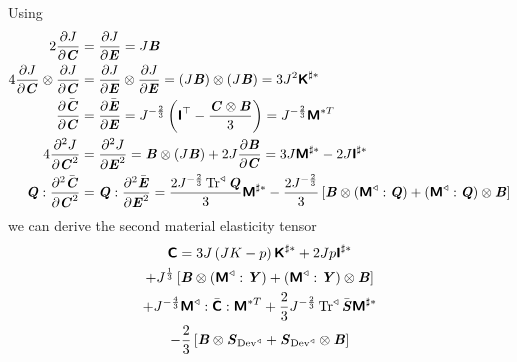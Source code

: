 Using
\begin{align}
  2\delby{J}{\tensor{C}}&=\delby{J}{\tensor{E}}=J\tensor{B} \\
  4\tensorprod{\delby{J}{\tensor{C}}}{\delby{J}{\tensor{C}}}&=\tensorprod{\delby{J}{\tensor{E}}}{\delby{J}{\tensor{E}}}=\tensorprod{\pbrac{J\tensor{B}}}{\pbrac{J\tensor{B}}}=3J^{2}\tensorfour{K}^{\sharp
    *} \\
  \delby{\bar{\tensor{C}}}{\tensor{C}}&=\delby{\bar{\tensor{E}}}{\tensor{E}}=J^{-\frac{2}{3}}\pbrac{\transpose{\tensorfour{I}}-\dfrac{\tensorprod{\tensor{C}}{\tensor{B}}}{3}}=J^{-\frac{2}{3}}\tensorfour{M}^{*T} \\
  4\deltwosqby{J}{\tensor{C}}&=\deltwosqby{J}{\tensor{E}}=\tensorprod{\tensor{B}}{\pbrac{J\tensor{B}}}+2J\delby{\tensor{B}}{\tensor{C}}=3J\tensorfour{M}^{\sharp
    *}-2J\tensorfour{I}^{\sharp
    *} \\
  \doubledotprod{\tensor{Q}}{\deltwosqby{\bar{\tensor{C}}}{\tensor{C}}}&=\doubledotprod{\tensor{Q}}{\deltwosqby{\bar{\tensor{E}}}{\tensor{E}}}=\dfrac{2J^{-\frac{2}{3}}\pullback{\Trop}{\tensor{Q}}}{3}\tensorfour{M}^{\sharp
  *}-\dfrac{2J^{-\frac{2}{3}}}{3}\sqbrac{\tensorprod{\tensor{B}}{\pbrac{\doubledotprod{\pullback{\tensorfour{M}}{}}{\tensor{Q}}}}+\tensorprod{\pbrac{\doubledotprod{\pullback{\tensorfour{M}}{}}{\tensor{Q}}}}{\tensor{B}}}
\end{align}
we can derive the second material elasticity tensor
\begin{multline}
  \tensorfour{C}=3J\pbrac{JK-p}\tensorfour{K}^{\sharp
    *}+2Jp\tensorfour{I}^{\sharp
    *}\\
  +J^{\frac{1}{3}}\sqbrac{\tensorprod{\tensortwo{B}}{\pbrac{\doubledotprod{\pullback{\tensorfour{M}}}{\tensortwo{Y}}{}}}+\tensorprod{\pbrac{\doubledotprod{\pullback{\tensorfour{M}}{}}{\tensortwo{Y}}}}{\tensortwo{B}}}
  \\
  +J^{-\frac{4}{3}}\doubledotprodthree{\pullback{\tensorfour{M}}{}}{\bar{\tensorfour{C}}}{\tensorfour{M}^{*T}}+\dfrac{2}{3}J^{-\frac{2}{3}}\pullback{\Trop}{}\bar{\tensortwo{S}}\tensorfour{M}^{\sharp
    *}\\
  -\dfrac{2}{3}\sqbrac{\tensorprod{\tensortwo{B}}{\tensor{S}_{\pullback{\Devop}{}}}+\tensorprod{\tensortwo{S}_{\pullback{\Devop}{}}}{\tensortwo{B}}}
\end{multline}


